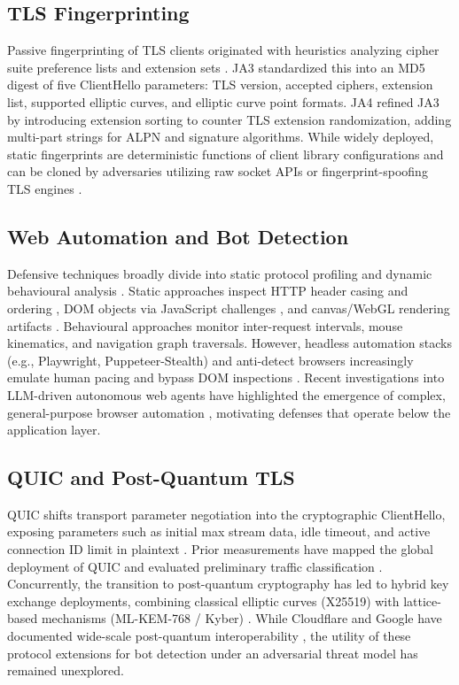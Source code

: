 \documentclass[conference]{IEEEtran}
\begin{document}
\subsection{TLS Fingerprinting}
Passive fingerprinting of TLS clients originated with heuristics analyzing cipher suite preference lists and extension sets \cite{anderson2016identifying}. JA3 \cite{althouse2017ja3} standardized this into an MD5 digest of five ClientHello parameters: TLS version, accepted ciphers, extension list, supported elliptic curves, and elliptic curve point formats. JA4 \cite{foxio2024ja4} refined JA3 by introducing extension sorting to counter TLS extension randomization, adding multi-part strings for ALPN and signature algorithms. While widely deployed, static fingerprints are deterministic functions of client library configurations and can be cloned by adversaries utilizing raw socket APIs or fingerprint-spoofing TLS engines \cite{vastel2020fp, jordan2022synthetic}.

\subsection{Web Automation and Bot Detection}
Defensive techniques broadly divide into static protocol profiling and dynamic behavioural analysis \cite{hou2020botmeter}. Static approaches inspect HTTP header casing and ordering \cite{foxio2024ja4}, DOM objects via JavaScript challenges \cite{laperdrix2016beauty}, and canvas/WebGL rendering artifacts \cite{mowery2011fingerprinting, starov2018extended}. Behavioural approaches monitor inter-request intervals, mouse kinematics, and navigation graph traversals. However, headless automation stacks (e.g., Playwright, Puppeteer-Stealth) and anti-detect browsers increasingly emulate human pacing and bypass DOM inspections \cite{jordan2022synthetic}. Recent investigations into LLM-driven autonomous web agents have highlighted the emergence of complex, general-purpose browser automation \cite{llm_bot_study2026}, motivating defenses that operate below the application layer.

\subsection{QUIC and Post-Quantum TLS}
QUIC \cite{rfc9000} shifts transport parameter negotiation into the cryptographic ClientHello, exposing parameters such as initial max stream data, idle timeout, and active connection ID limit in plaintext \cite{yu2021first}. Prior measurements have mapped the global deployment of QUIC \cite{piraux2021observing, zirngibl2021performance} and evaluated preliminary traffic classification \cite{sy2020fingerprinting}. Concurrently, the transition to post-quantum cryptography has led to hybrid key exchange deployments, combining classical elliptic curves (X25519) with lattice-based mechanisms (ML-KEM-768 / Kyber) \cite{fips203, paquin2020benchmarking}. While Cloudflare and Google have documented wide-scale post-quantum interoperability \cite{cloudflare2024pq}, the utility of these protocol extensions for bot detection under an adversarial threat model has remained unexplored.
\end{document}
